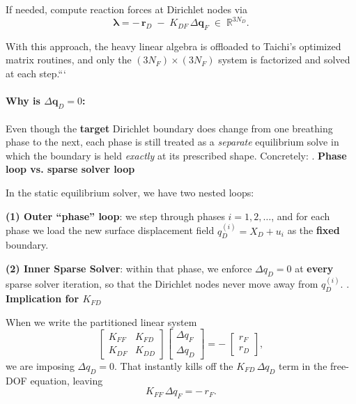 \documentclass{article}
\begin{document}
If needed, compute reaction forces at Dirichlet nodes via
\[
  \boldsymbol\lambda
  = -\,\mathbf r_D \;-\; K_{DF}\,\Delta\mathbf q_F
  \;\in\;\mathbb R^{3N_D}.
\]

With this approach, the heavy linear algebra is offloaded to Taichi’s optimized matrix routines, and only the \((3N_F)\times(3N_F)\) system is factorized and solved at each step.```





\paragraph{Why is $\Delta \mathbf{q}_D=0$:}
Even though the \textbf{target} Dirichlet boundary does change from one breathing phase to the next,
each phase is still treated as a \textit{separate} equilibrium solve in which the boundary is held \textit{exactly} at its prescribed shape.  
Concretely:
. \textbf{Phase loop vs. sparse solver loop}

In the static equilibrium solver, we have two nested loops:

\textbf{(1) Outer “phase” loop}: we step through phases $i=1,2,\dots$, 
and for each phase we load the new surface displacement field $q_D^{(i)} = X_D + u_i$ as the \textbf{fixed} boundary.

\textbf{(2) Inner Sparse Solver}: within that phase, we enforce $\Delta q_D = 0$ at \textbf{every} sparse solver iteration, 
so that the Dirichlet nodes never move away from $q_D^{(i)}$.
. \textbf{Implication for $K_{FD}$} 

When we write the partitioned linear system
   $$
     \begin{bmatrix}
       K_{FF} & K_{FD} \\
       K_{DF} & K_{DD}
     \end{bmatrix}
     \begin{bmatrix}
       \Delta q_F\\[3pt]
       \Delta q_D
     \end{bmatrix}
     = -\;
     \begin{bmatrix}
       r_F\\[3pt]
       r_D
     \end{bmatrix},
   $$
   we are imposing $\Delta q_D=0$.  That instantly kills off the $K_{FD}\,\Delta q_D$ term in the free-DOF equation, leaving
   $$
     K_{FF}\,\Delta q_F = -\,r_F.
   $$
\end{document}
